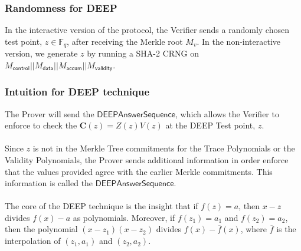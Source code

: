 \documentclass[10pt,letterpaper,titlepage]{article}
\newcommand{\GF}[1]{\mathbb{F}_{#1}}
\theoremstyle{definition}
\begin{document}
\begin{appendices}
\subsubsection{Randomness for DEEP}
\label{choose test point}
In the interactive version of the protocol, the Verifier sends a randomly chosen test point, $z\in\GF{q}$, after receiving the Merkle root $M_{v}$. 
In the non-interactive version, we generate $z$ by running a SHA-2 CRNG on $M_\mathsf{control}||M_\mathsf{data}||M_\mathsf{accum}||M_\mathsf{validity}$.

\subsubsection{Intuition for DEEP technique}
\label{checking the relation}
\label{necessary evaluations}
The Prover will send the $\mathsf{DEEPAnswerSequence}$, which allows the Verifier to enforce to check the $\mathbf{C}(z)=Z(z)V(z)$ at the DEEP Test point, $z$. \\
\\
Since $z$ is not in the Merkle Tree commitments for the Trace Polynomials or the Validity Polynomials, the Prover sends additional information in order enforce that the values provided agree with the earlier Merkle commitments. 
This information is called the $\mathsf{DEEPAnswerSequence}$.\\
\\
The core of the DEEP technique is the insight that if $f(z)=a$, then $x-z$ divides $f(x)-a$ as polynomials. 
Moreover, if $f(z_1)=a_1$ and $f(z_2)=a_2$, then the polynomial $(x-z_1)(x-z_2)$ divides $f(x)-\overline{f}(x)$, where $\overline{f}$ is the interpolation of $(z_1,a_1)$ and $(z_2,a_2)$. 

\end{appendices}
\end{document}
